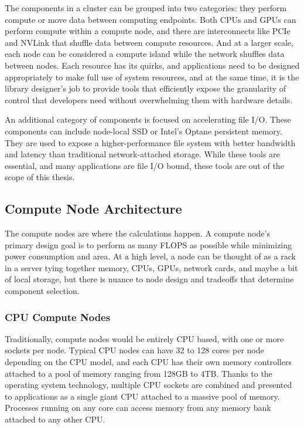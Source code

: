 The components in a cluster can be grouped into two categories: they perform compute or move data between computing endpoints.
Both CPUs and GPUs can perform compute within a compute node, and there are interconnects like PCIe and NVLink that shuffle data between compute resources.
And at a larger scale, each node can be considered a compute island while the network shuffles data between nodes.
Each resource has its quirks, and applications need to be designed appropriately to make full use of system resources, and at the same time, it is the library designer's job to provide tools that efficiently expose the granularity of control that developers need without overwhelming them with hardware details.

An additional category of components is focused on accelerating file I/O.
These components can include node-local SSD or Intel's Optane persistent memory. 
They are used to expose a higher-performance file system with better bandwidth and latency than traditional network-attached storage.
While these tools are essential, and many applications are file I/O bound, these tools are out of the scope of this thesis. 

\subsection{Compute Node Architecture}
The compute nodes are where the calculations happen.
A compute node's primary design goal is to perform as many FLOPS as possible while minimizing power consumption and area.
At a high level, a node can be thought of as a rack in a server tying together memory, CPUs, GPUs, network cards, and maybe a bit of local storage, but there is nuance to node design and tradeoffs that determine component selection. 

\subsubsection{CPU Compute Nodes}
Traditionally, compute nodes would be entirely CPU based, with one or more sockets per node.
Typical CPU nodes can have 32 to 128 cores per node depending on the CPU model, and each CPU has their own memory controllers attached to a pool of memory ranging from 128GB to 4TB.
Thanks to the operating system technology, multiple CPU sockets are combined and presented to applications as a single giant CPU attached to a massive pool of memory. 
Processes running on any core can access memory from any memory bank attached to any other CPU.

